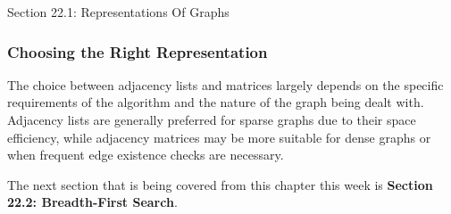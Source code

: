 \begin{notes}{Section 22.1: Representations Of Graphs}
    \subsubsection*{Choosing the Right Representation}
    
    The choice between adjacency lists and matrices largely depends on the specific requirements of the algorithm and the nature of the graph being dealt with. Adjacency lists are generally preferred 
    for sparse graphs due to their space efficiency, while adjacency matrices may be more suitable for dense graphs or when frequent edge existence checks are necessary.
\end{notes}

The next section that is being covered from this chapter this week is \textbf{Section 22.2: Breadth-First Search}.

